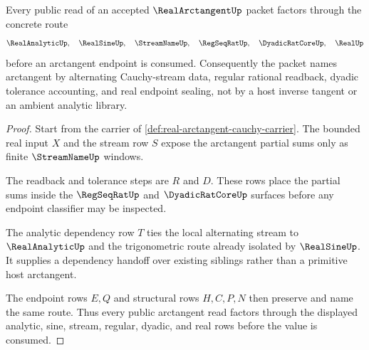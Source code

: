 \begin{theorem}
\label{thm:real-arctangent-stream-dependency-route}
Every public read of an accepted $\RealArctangentUp$ packet factors through the concrete route
$$
\RealAnalyticUp,\quad
\RealSineUp,\quad
\StreamNameUp,\quad
\RegSeqRatUp,\quad
\DyadicRatCoreUp,\quad
\RealUp
$$
before an arctangent endpoint is consumed. Consequently the packet names arctangent by alternating Cauchy-stream data, regular rational readback, dyadic tolerance accounting, and real endpoint sealing, not by a host inverse tangent or an ambient analytic library.
\end{theorem}
\begin{proof}
Start from the carrier of \autoref{def:real-arctangent-cauchy-carrier}. The bounded real input $X$ and the stream row $S$ expose the arctangent partial sums only as finite $\StreamNameUp$ windows.

The readback and tolerance steps are $R$ and $D$. These rows place the partial sums inside the $\RegSeqRatUp$ and $\DyadicRatCoreUp$ surfaces before any endpoint classifier may be inspected.

The analytic dependency row $T$ ties the local alternating stream to $\RealAnalyticUp$ and the trigonometric route already isolated by $\RealSineUp$. It supplies a dependency handoff over existing siblings rather than a primitive host arctangent.

The endpoint rows $E,Q$ and structural rows $H,C,P,N$ then preserve and name the same route. Thus every public arctangent read factors through the displayed analytic, sine, stream, regular, dyadic, and real rows before the value is consumed.
\end{proof}



